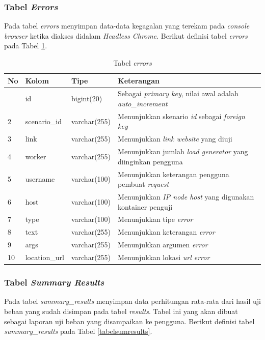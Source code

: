 			\subsubsection{Tabel \textit{Errors}}
				Pada tabel \textit{errors} menyimpan data-data kegagalan yang terekam pada \textit{console browser} ketika diakses didalam \textit{Headless Chrome}. Berikut definisi tabel \textit{errors} pada Tabel \ref{tabelerrors}.
				
				\begin{longtable}{|p{}|p{}|p{}|p{}|}
					\caption{Tabel \textit{errors}} \label{tabelerrors} \\
					\hline
					\textbf{No} & \textbf{Kolom} & \textbf{Tipe} & \textbf{Keterangan} \\ \hline
					\endhead
					\endfoot
					\endlastfoot
					1 & id & bigint(20) & Sebagai \textit{primary key}, nilai awal adalah \textit{auto\_increment} \\ \hline
					2 & scenario\_id & varchar(255) & Menunjukkan skenario \textit{id} sebagai \textit{foreign key} \\ \hline
					3 & link & varchar(255) & Menunjukkan \textit{link website} yang diuji \\ \hline
					4 & worker & varchar(255) & Menunjukkan jumlah \textit{load generator} yang diinginkan pengguna \\ \hline
					5 & username & varchar(100) & Menunjukkan keterangan pengguna pembuat \textit{request} \\ \hline
					6 & host & varchar(100) & Menunjukkan \textit{IP node host} yang digunakan kontainer penguji \\ \hline
					7 & type & varchar(100) & Menunjukkan tipe \textit{error} \\ \hline
					8 & text & varchar(255) & Menunjukkan keterangan \textit{error} \\ \hline
					9 & args & varchar(255) & Menunjukkan argumen \textit{error} \\ \hline
					10 & location\_url & varchar(255) & Menunjukkan lokasi \textit{url error} \\ \hline
				\end{longtable}
		
			\subsubsection{Tabel \textit{Summary Results}}
				Pada tabel \textit{summary\_results} menyimpan data perhitungan rata-rata dari hasil uji beban yang sudah disimpan pada tabel \textit{results}. Tabel ini yang akan dibuat sebagai laporan uji beban yang disampaikan ke pengguna. Berikut definisi tabel \textit{summary\_results} pada Tabel \ref{tabelsumresults}.
			
